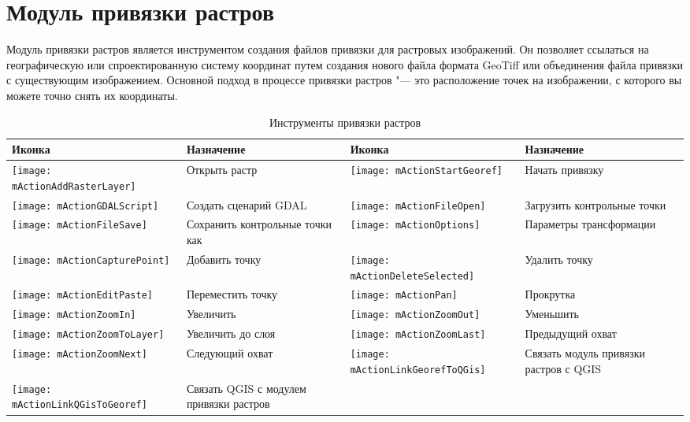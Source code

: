 
\section{Модуль привязки растров}


Модуль привязки растров является инструментом создания файлов привязки
для растровых изображений. Он позволяет ссылаться на географическую или
спроектированную систему координат путем создания нового файла формата
GeoTiff или объединения файла привязки с существующим изображением.
Основной подход в процессе привязки растров "--- это расположение точек на
изображении, с которого вы можете точно снять их координаты.


\begin{table}[h]
\begin{tabular}{|m{1cm}|m{6cm}|m{1cm}|m{6cm}|}
 \hline \textbf{Иконка} & \textbf{Назначение} & \textbf{Иконка} &
 \textbf{Назначение} \\
 \hline \texttt{[image: mActionAddRasterLayer]} & Открыть растр &
 \texttt{[image: mActionStartGeoref]} & Начать привязку \\
 \hline \texttt{[image: mActionGDALScript]} & Создать сценарий GDAL &
 \texttt{[image: mActionFileOpen]} & Загрузить контрольные точки \\
 \hline \texttt{[image: mActionFileSave]} & Сохранить контрольные точки как &
 \texttt{[image: mActionOptions]} & Параметры трансформации \\
 \hline \texttt{[image: mActionCapturePoint]} & Добавить точку &
 \texttt{[image: mActionDeleteSelected]} & Удалить точку \\
 \hline \texttt{[image: mActionEditPaste]} & Переместить точку &
 \texttt{[image: mActionPan]} & Прокрутка \\
 \hline \texttt{[image: mActionZoomIn]} & Увеличить &
 \texttt{[image: mActionZoomOut]} & Уменьшить \\
 \hline \texttt{[image: mActionZoomToLayer]} & Увеличить до слоя &
 \texttt{[image: mActionZoomLast]} & Предыдущий охват \\
 \hline \texttt{[image: mActionZoomNext]} & Следующий охват &
 \texttt{[image: mActionLinkGeorefToQGis]} & Связать модуль привязки растров с QGIS \\
 \hline \texttt{[image: mActionLinkQGisToGeoref]} & Связать QGIS с модулем привязки растров &
 &  \\
\hline
\end{tabular}
\caption{Инструменты привязки растров}\label{tab:georeferencer_tools}
\end{table}

